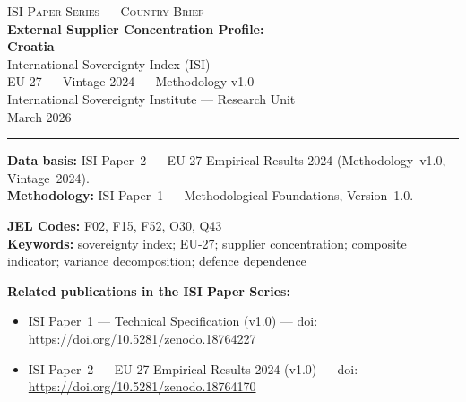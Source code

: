 \documentclass[12pt,a4paper]{article}
\begin{document}
\hypersetup{pageanchor=false}

\begin{titlepage}
\centering
\vspace*{2cm}
{\Large\textsc{ISI Paper Series --- Country Brief}}\\[1.2cm]
{\LARGE\bfseries External Supplier Concentration Profile:\\[0.3em]
Croatia}\\[1.5cm]
{\large International Sovereignty Index (ISI)\\[0.3em]
EU-27 --- Vintage 2024 --- Methodology v1.0}\\[1.2cm]
{\large International Sovereignty Institute --- Research Unit}\\[0.8cm]
{\large March 2026}

\vspace{0.8cm}
\noindent\rule{\textwidth}{0.4pt}
\vspace{0.4cm}

\begin{flushleft}
\noindent\textbf{Data basis:} ISI Paper~2 --- EU-27 Empirical Results 2024 (Methodology~v1.0, Vintage~2024).\\[4pt]
\noindent\textbf{Methodology:} ISI Paper~1 --- Methodological Foundations, Version~1.0.

\medskip

\noindent\textbf{JEL Codes:} F02, F15, F52, O30, Q43\\[4pt]
\noindent\textbf{Keywords:} sovereignty index; EU-27; supplier concentration; composite indicator; variance decomposition; defence dependence

\medskip

\noindent\textbf{Related publications in the ISI Paper Series:}
\begin{itemize}[nosep,leftmargin=1.5em]
\item ISI Paper~1 --- Technical Specification (v1.0) --- doi:\\
  \url{https://doi.org/10.5281/zenodo.18764227}
\item ISI Paper~2 --- EU-27 Empirical Results 2024 (v1.0) --- doi:\\
  \url{https://doi.org/10.5281/zenodo.18764170}
\end{itemize}
\end{flushleft}
\vfill
\end{titlepage}
\end{document}
